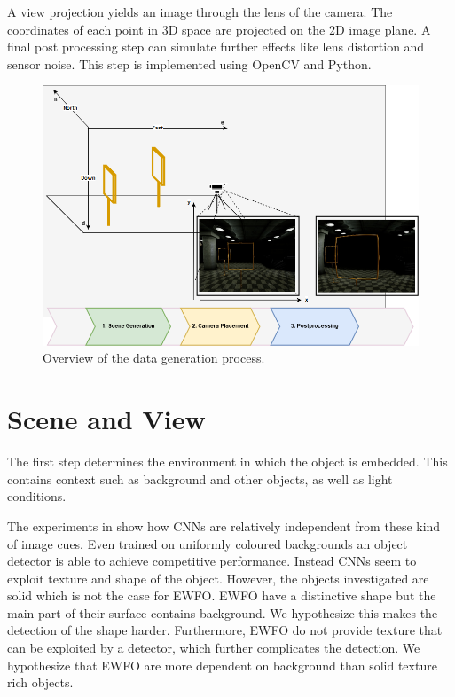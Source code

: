 A view projection yields an image through the lens of the camera. The coordinates of each point in 3D space are projected on the 2D image plane. A final post processing step can simulate further effects like lens distortion and sensor noise. This step is implemented using OpenCV and Python.

\begin{figure}[htbp]
	\centering
	\includegraphics[width=\textwidth]{fig/datagen_notation}
	\caption{Overview of the data generation process.}
	\label{fig:training:datagen_notation}
\end{figure}



\section{Scene and View}
\label{sec:training:scene}

The first step determines the environment in which the object is embedded. This contains context such as background and other objects, as well as light conditions. 

The experiments in \cite{Peng} show how \acp{CNN} are relatively independent from these kind of image cues. Even trained on uniformly coloured backgrounds an object detector is able to achieve competitive performance. Instead \acp{CNN} seem to exploit texture and shape of the object. However, the objects investigated are solid which is not the case for \ac{EWFO}. \ac{EWFO} have a distinctive shape but the main part of their surface contains background. We hypothesize this makes the detection of the shape harder. Furthermore, \ac{EWFO} do not provide texture that can be exploited by a detector, which further complicates the detection. We hypothesize that \ac{EWFO} are more dependent on background than solid texture rich objects. 

